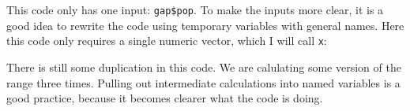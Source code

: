 \documentclass[
]{book}
\newenvironment{Shaded}{\begin{snugshade}}{\end{snugshade}}
\newcommand{\CommentTok}[1]{\textcolor[rgb]{0.56,0.35,0.01}{\textit{#1}}}
\newcommand{\DataTypeTok}[1]{\textcolor[rgb]{0.13,0.29,0.53}{#1}}
\newcommand{\KeywordTok}[1]{\textcolor[rgb]{0.13,0.29,0.53}{\textbf{#1}}}
\newcommand{\NormalTok}[1]{#1}
\newcommand{\OperatorTok}[1]{\textcolor[rgb]{0.81,0.36,0.00}{\textbf{#1}}}
\newcommand{\StringTok}[1]{\textcolor[rgb]{0.31,0.60,0.02}{#1}}
\begin{document}
\begin{Shaded}
\end{Shaded}

This code only has one input: \texttt{gap\$pop}. To make the inputs more clear, it is a good idea to rewrite the code using temporary variables with general names. Here this code only requires a single numeric vector, which I will call \texttt{x}:

\begin{Shaded}
\end{Shaded}

There is still some duplication in this code. We are calulating some version of the range three times. Pulling out intermediate calculations into named variables is a good practice, because it becomes clearer what the code is doing.
\end{document}
